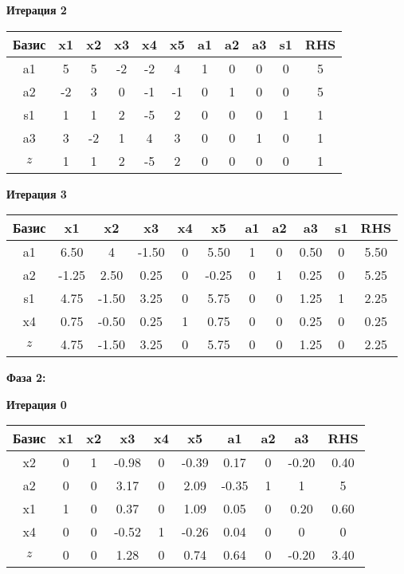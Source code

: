 \documentclass[a4paper,12pt]{article}
\begin{document}
 \textbf{Итерация 2}\\
\begin{tabular}{|c|c|c|c|c|c|c|c|c|c|c|}
\hline
Базис & x1 & x2 & x3 & x4 & x5 & a1 & a2 & a3 & s1 & RHS \\ \hline
a1 & 5 & 5 & -2 & -2 & 4 & 1 & 0 & 0 & 0 & 5 \\ \hline
a2 & -2 & 3 & 0 & -1 & -1 & 0 & 1 & 0 & 0 & 5 \\ \hline
s1 & 1 & 1 & 2 & -5 & 2 & 0 & 0 & 0 & 1 & 1 \\ \hline
a3 & 3 & -2 & 1 & 4 & 3 & 0 & 0 & 1 & 0 & 1 \\ \hline
$z$ & 1 & 1 & 2 & -5 & 2 & 0 & 0 & 0 & 0 & 1 \\ \hline
\end{tabular}
\vspace{5mm}

 \textbf{Итерация 3}\\
\begin{tabular}{|c|c|c|c|c|c|c|c|c|c|c|}
\hline
Базис & x1 & x2 & x3 & x4 & x5 & a1 & a2 & a3 & s1 & RHS \\ \hline
a1 & 6.50 & 4 & -1.50 & 0 & 5.50 & 1 & 0 & 0.50 & 0 & 5.50 \\ \hline
a2 & -1.25 & 2.50 & 0.25 & 0 & -0.25 & 0 & 1 & 0.25 & 0 & 5.25 \\ \hline
s1 & 4.75 & -1.50 & 3.25 & 0 & 5.75 & 0 & 0 & 1.25 & 1 & 2.25 \\ \hline
x4 & 0.75 & -0.50 & 0.25 & 1 & 0.75 & 0 & 0 & 0.25 & 0 & 0.25 \\ \hline
$z$ & 4.75 & -1.50 & 3.25 & 0 & 5.75 & 0 & 0 & 1.25 & 0 & 2.25 \\ \hline
\end{tabular}
\vspace{5mm}

\textbf{Фаза 2:}


 \textbf{Итерация 0}\\
\begin{tabular}{|c|c|c|c|c|c|c|c|c|c|}
\hline
Базис & x1 & x2 & x3 & x4 & x5 & a1 & a2 & a3 & RHS \\ \hline
x2 & 0 & 1 & -0.98 & 0 & -0.39 & 0.17 & 0 & -0.20 & 0.40 \\ \hline
a2 & 0 & 0 & 3.17 & 0 & 2.09 & -0.35 & 1 & 1 & 5 \\ \hline
x1 & 1 & 0 & 0.37 & 0 & 1.09 & 0.05 & 0 & 0.20 & 0.60 \\ \hline
x4 & 0 & 0 & -0.52 & 1 & -0.26 & 0.04 & 0 & 0 & 0 \\ \hline
$z$ & 0 & 0 & 1.28 & 0 & 0.74 & 0.64 & 0 & -0.20 & 3.40 \\ \hline
\end{tabular}
\vspace{5mm}
\end{document}
